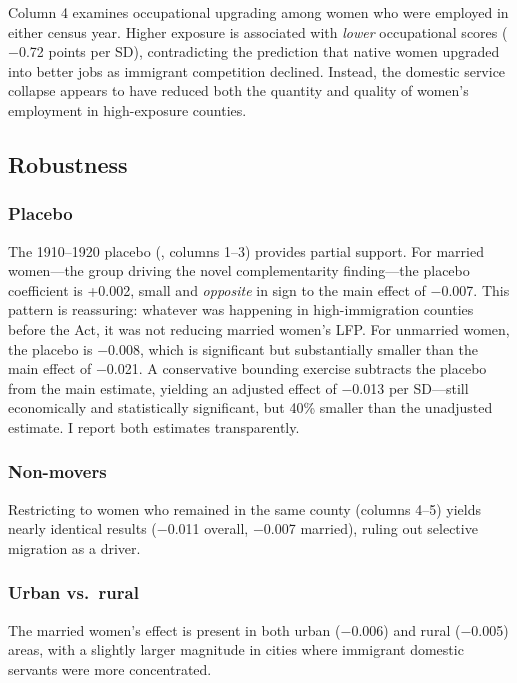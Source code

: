 \documentclass[12pt]{article}
\begin{document}
Column 4 examines occupational upgrading among women who were employed in either census year. Higher exposure is associated with \emph{lower} occupational scores ($-$0.72 points per SD), contradicting the prediction that native women upgraded into better jobs as immigrant competition declined. Instead, the domestic service collapse appears to have reduced both the quantity and quality of women's employment in high-exposure counties.


\subsection{Robustness}



\subsubsection*{Placebo} The 1910--1920 placebo (, columns 1--3) provides partial support. For married women---the group driving the novel complementarity finding---the placebo coefficient is +0.002, small and \emph{opposite} in sign to the main effect of $-$0.007. This pattern is reassuring: whatever was happening in high-immigration counties before the Act, it was not reducing married women's LFP. For unmarried women, the placebo is $-$0.008, which is significant but substantially smaller than the main effect of $-$0.021. A conservative bounding exercise subtracts the placebo from the main estimate, yielding an adjusted effect of $-$0.013 per SD---still economically and statistically significant, but 40\% smaller than the unadjusted estimate. I report both estimates transparently.

\subsubsection*{Non-movers} Restricting to women who remained in the same county (columns 4--5) yields nearly identical results ($-$0.011 overall, $-$0.007 married), ruling out selective migration as a driver.

\subsubsection*{Urban vs.\ rural} The married women's effect is present in both urban ($-$0.006) and rural ($-$0.005) areas, with a slightly larger magnitude in cities where immigrant domestic servants were more concentrated.
\end{document}
